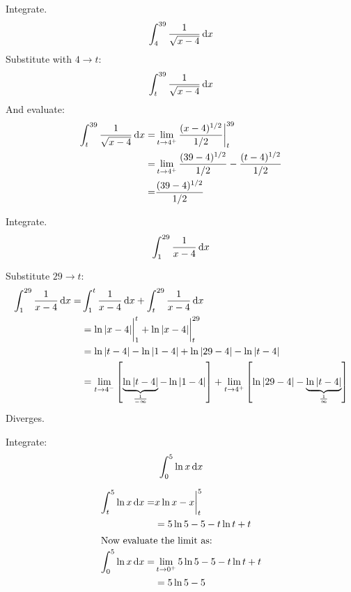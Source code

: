 \begin{ex}
  Integrate.
  \[ \int^{39}_4 \frac{1}{\sqrt{x-4}} \,\mathrm{d} x \]
  Substitute with $4 \to t$:
  \[ \int^{39}_t \frac{1}{\sqrt{x-4}} \,\mathrm{d} x \]
  And evaluate:
  \begin{align*}
    \int^{39}_t \frac{1}{\sqrt{x-4}} \,\mathrm{d} x
    =& \lim_{t \to 4^+} \frac{(x-4)^{1/2}}{1/2} \bigg|^{39}_t \\
    =& \lim_{t \to 4^+} \frac{(39-4)^{1/2}}{1/2}-\frac{(t-4)^{1/2}}{1/2} \\
    =& \frac{(39-4)^{1/2}}{1/2}
  \end{align*}
\end{ex}
\begin{ex}
  Integrate.
  \[ \int^{29}_1 \frac{1}{x-4} \,\mathrm{d} x \]
  \begin{sol}
    Substitute $29 \to t$:
    \begin{align*}
      \int^{29}_1 \frac{1}{x-4} \,\mathrm{d} x =& \int^t_1 \frac{1}{x-4} \,\mathrm{d} x
      + \int^{29}_t \frac{1}{x-4} \,\mathrm{d} x \\
      &= \ln{|x-4|}\bigg|^t_1 + \ln{|x-4|} \bigg|^{29}_t \\
      &=\ln{|t-4|}-\ln{|1-4|}+\ln{|29-4|}-\ln{|t-4|} \\
      &=\lim_{t \to 4^-} \left[\underbrace{\ln{|t-4|}}_{\frac{1}{-\infty}}-\ln{|1-4|}\right]+\lim_{t \to 4^+} \left[\ln{|29-4|}-\underbrace{\ln{|t-4|}}_{\frac{1}{\infty}}\right]
    \end{align*}
    Diverges.
  \end{sol}
\end{ex}
\begin{ex}
  Integrate:
  \[ \int^5_0 \ln{x} \,\mathrm{d} x \]
  \begin{sol}
  \begin{align*}
    \int^5_t \ln{x} \,\mathrm{d} x =&x \ln{x} -x \bigg|^5_t \\
    &=5 \ln{5} -5-t\ln{t}+t \\
    \intertext{Now evaluate the limit as:}
    \int^5_0 \ln{x} \,\mathrm{d} x =& \lim_{t \to 0^+}5 \ln{5} -5-t\ln{t}+t \\
    &=5 \ln 5 - 5
  \end{align*}
\end{sol}
\end{ex}

%
%

